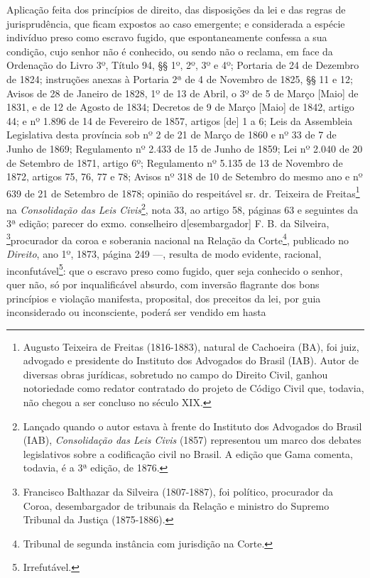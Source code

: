 Aplicação feita dos princípios de direito, das disposições da lei e das
regras de jurisprudência, que ficam expostos ao caso emergente; e
considerada a espécie indivíduo preso como escravo fugido, que
espontaneamente confessa a sua condição, cujo senhor não é conhecido, ou
sendo não o reclama, em face da Ordenação do Livro 3º, Título 94, §§ 1º,
2º, 3º e 4º; Portaria de 24 de Dezembro de 1824; instruções anexas à
Portaria 2ª de 4 de Novembro de 1825, §§ 11 e 12; Avisos de 28 de
Janeiro de 1828, 1º de 13 de Abril, o 3º de 5 de Março {[}Maio{]} de
1831, e de 12 de Agosto de 1834; Decretos de 9 de Março {[}Maio{]} de
1842, artigo 44; e nº 1.896 de 14 de Fevereiro de 1857, artigos {[}de{]}
1 a 6; Leis da Assembleia Legislativa desta província sob nº 2 de 21 de
Março de 1860 e nº 33 de 7 de Junho de 1869; Regulamento nº 2.433 de 15
de Junho de 1859; Lei nº 2.040 de 20 de Setembro de 1871, artigo 6º;
Regulamento nº 5.135 de 13 de Novembro de 1872, artigos 75, 76, 77 e 78;
Avisos nº 318 de 10 de Setembro do mesmo ano e nº 639 de 21 de Setembro
de 1878; opinião do respeitável sr. dr. Teixeira de Freitas\footnote{
  Augusto Teixeira de Freitas (1816-1883), natural de Cachoeira (BA),
  foi juiz, advogado e presidente do Instituto dos Advogados do Brasil
  (IAB). Autor de diversas obras jurídicas, sobretudo no campo do
  Direito Civil, ganhou notoriedade como redator contratado do projeto
  de Código Civil que, todavia, não chegou a ser concluso no século XIX.}
na \emph{Consolidação das Leis Civis}\footnote{Lançado quando o autor
  estava à frente do Instituto dos Advogados do Brasil (IAB),
  \emph{Consolidação das Leis Civis} (1857) representou um marco dos
  debates legislativos sobre a codificação civil no Brasil. A edição que
  Gama comenta, todavia, é a 3ª edição, de 1876.}, nota 33, ao artigo
58, páginas 63 e seguintes da 3ª edição; parecer do exmo. conselheiro
d{[}esembargador{]} F. B. da Silveira, \footnote{Francisco Balthazar
  da Silveira (1807-1887), foi político, procurador da Coroa,
  desembargador de tribunais da Relação e ministro do Supremo Tribunal
  da Justiça (1875-1886).}procurador da coroa e soberania nacional na
Relação da Corte\footnote{Tribunal de segunda instância com jurisdição
  na Corte.}, publicado no \emph{Direito}, ano 1º, 1873, página 249
---, resulta de modo evidente, racional, inconfutável\footnote{
  Irrefutável.}: que o escravo preso como fugido, quer seja conhecido o
senhor, quer não, só por inqualificável absurdo, com inversão flagrante
dos bons princípios e violação manifesta, proposital, dos preceitos da
lei, por guia inconsiderado ou inconsciente, poderá ser vendido em hasta
